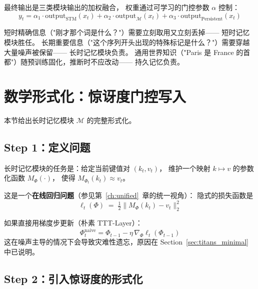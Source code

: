 最终输出是三类模块输出的加权融合，
权重通过可学习的门控参数 $\alpha$ 控制：
\[
  y_t = \alpha_1 \cdot \text{output}_{\text{STM}}(x_t) +
        \alpha_2 \cdot \text{output}_{\mathcal{M}}(x_t) +
        \alpha_3 \cdot \text{output}_{\text{Persistent}}(x_t)
\]

\begin{insight}[title=设计直觉：不同信息的"保质期"不同]
短时精确信息（"刚才那个词是什么？"）需要立刻取用又立刻丢掉——
短时记忆模块胜任。
长期重要信息（"这个序列开头出现的特殊标记是什么？"）需要穿越大量噪声被保留——
长时记忆模块负责。
通用世界知识（"Paris 是 France 的首都"）随预训练固化，推断时不应改动——
持久记忆负责。
\end{insight}

\section{数学形式化：惊讶度门控写入}
\label{sec:titans_math}

本节给出长时记忆模块 $\mathcal{M}$ 的完整形式化。

\subsection*{Step 1：定义问题}

长时记忆模块的任务是：给定当前键值对 $(k_t, v_t)$，
维护一个映射 $k \mapsto v$ 的参数化函数 $M_{\Phi}(\cdot)$，
使得 $M_{\Phi_t}(k_t) \approx v_t$。

这是一个\textbf{在线回归问题}（参见第~\ref{ch:unified}~章的统一视角）：
隐式的损失函数是
\begin{equation}
  \ell_t(\Phi) \;=\; \tfrac{1}{2}\bigl\| M_{\Phi}(k_t) - v_t \bigr\|_2^2
  \label{eq:titans_loss}
\end{equation}

如果直接用梯度步更新（朴素 TTT-Layer）：
\begin{equation}
  \Phi_t^{\text{naive}} = \Phi_{t-1} - \eta\,\nabla_\Phi \ell_t(\Phi_{t-1})
  \label{eq:titans_naive}
\end{equation}
这在噪声主导的情况下会导致灾难性遗忘，原因在 Section~\ref{sec:titans_minimal} 中已说明。

\subsection*{Step 2：引入惊讶度的形式化}

